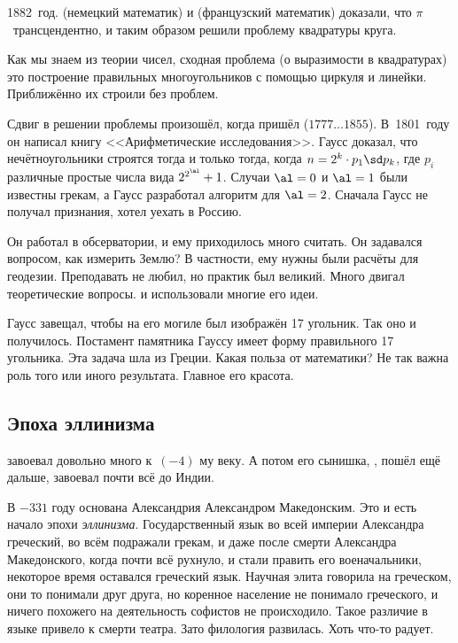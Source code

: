 \documentclass[a4paper,oneside,fleqn,10pt]{article}
\newcommand{\pe}[2]{${#1}\ldots{#2}$}
\begin{document}
1882~год.  (немецкий математик) и
 (французский математик) доказали, что
$\pi$~трансцендентно, и таким образом решили проблему квадратуры
круга.

Как мы знаем из теории чисел, сходная проблема (о выразимости в
квадратурах) это построение правильных многоугольников с помощью
циркуля и линейки.  Приближённо их строили без проблем.

Сдвиг в решении проблемы произошёл, когда пришёл  (\pe{1777}{1855}).  В~1801~году он написал книгу
<<Арифметические исследования>>.  Гаусс доказал, что нечётноугольники
строятся тогда и только тогда, когда $n = 2^k \cdot p_1 \sd p_k$, где
$p_i$ различные простые числа вида $2^{2^\al} +1$.  Случаи $\al = 0$ и
$\al = 1$ были известны грекам, а Гаусс разработал алгоритм для $\al =
2$.  Сначала Гаусс не получал признания, хотел уехать в Россию.

Он работал в обсерватории, и ему приходилось много считать. Он
задавался вопросом, как измерить Землю?  В частности, ему нужны были
расчёты для геодезии. Преподавать не любил, но практик был великий.
Много двигал теоретические вопросы.  и 
использовали многие его идеи.

Гаусс завещал, чтобы на его могиле был изображён 17 угольник.  Так оно
и получилось. Постамент памятника Гауссу  имеет форму правильного 17
угольника.  Эта задача шла из Греции. Какая польза от математики?  Не
так важна роль того или иного результата. Главное его красота.


\subsection{Эпоха эллинизма}

 завоевал довольно много к~$(-4)$ му веку. А
потом его сынишка, , пошёл ещё дальше,
завоевал почти всё до Индии.

В $-331$ году основана Александрия Александром Македонским.  Это и
есть начало эпохи \emph{эллинизма}. Государственный язык во всей
империи Александра греческий, во всём подражали грекам, и даже после
смерти Александра Македонского, когда почти всё рухнуло, и стали
править его военачальники, некоторое время оставался греческий язык.
Научная элита говорила на греческом, они то понимали друг друга, но
коренное население не понимало греческого, и ничего похожего на
деятельность софистов не происходило. Такое различие в языке привело к
смерти театра.  Зато филология развилась. Хоть что-то радует.
\end{document}
